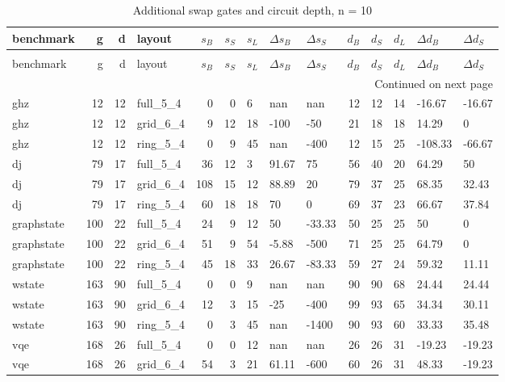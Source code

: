 \begin{longtable}{lrrlrrlllrrlll}
\caption{Additional swap gates and circuit depth, n = 10} \label{benchmark-table-10} \\
\toprule
benchmark & g & d & layout & $s_B$ & $s_S$ & $s_L$ & $\Delta s_B$ & $\Delta s_S$ & $d_B$ & $d_S$ & $d_L$ & $\Delta d_B$ & $\Delta d_S$ \\
\midrule
\endfirsthead
\caption[]{Additional swap gates and circuit depth, n = 10} \\
\toprule
benchmark & g & d & layout & $s_B$ & $s_S$ & $s_L$ & $\Delta s_B$ & $\Delta s_S$ & $d_B$ & $d_S$ & $d_L$ & $\Delta d_B$ & $\Delta d_S$ \\
\midrule
\endhead
\midrule
\multicolumn{14}{r}{Continued on next page} \\
\midrule
\endfoot
\bottomrule
\endlastfoot
ghz & 12 & 12 & full\_5\_4 & 0 & 0 & 6 & nan & nan & 12 & 12 & 14 & -16.67 & -16.67 \\
ghz & 12 & 12 & grid\_6\_4 & 9 & 12 & 18 & -100 & -50 & 21 & 18 & 18 & 14.29 & 0 \\
ghz & 12 & 12 & ring\_5\_4 & 0 & 9 & 45 & nan & -400 & 12 & 15 & 25 & -108.33 & -66.67 \\
dj & 79 & 17 & full\_5\_4 & 36 & 12 & 3 & 91.67 & 75 & 56 & 40 & 20 & 64.29 & 50 \\
dj & 79 & 17 & grid\_6\_4 & 108 & 15 & 12 & 88.89 & 20 & 79 & 37 & 25 & 68.35 & 32.43 \\
dj & 79 & 17 & ring\_5\_4 & 60 & 18 & 18 & 70 & 0 & 69 & 37 & 23 & 66.67 & 37.84 \\
graphstate & 100 & 22 & full\_5\_4 & 24 & 9 & 12 & 50 & -33.33 & 50 & 25 & 25 & 50 & 0 \\
graphstate & 100 & 22 & grid\_6\_4 & 51 & 9 & 54 & -5.88 & -500 & 71 & 25 & 25 & 64.79 & 0 \\
graphstate & 100 & 22 & ring\_5\_4 & 45 & 18 & 33 & 26.67 & -83.33 & 59 & 27 & 24 & 59.32 & 11.11 \\
wstate & 163 & 90 & full\_5\_4 & 0 & 0 & 9 & nan & nan & 90 & 90 & 68 & 24.44 & 24.44 \\
wstate & 163 & 90 & grid\_6\_4 & 12 & 3 & 15 & -25 & -400 & 99 & 93 & 65 & 34.34 & 30.11 \\
wstate & 163 & 90 & ring\_5\_4 & 0 & 3 & 45 & nan & -1400 & 90 & 93 & 60 & 33.33 & 35.48 \\
vqe & 168 & 26 & full\_5\_4 & 0 & 0 & 12 & nan & nan & 26 & 26 & 31 & -19.23 & -19.23 \\
vqe & 168 & 26 & grid\_6\_4 & 54 & 3 & 21 & 61.11 & -600 & 60 & 26 & 31 & 48.33 & -19.23 \\

\end{longtable}
